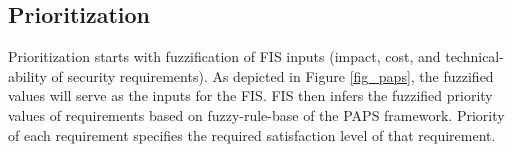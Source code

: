 \subsection{Prioritization}
\label{pas_prior}

Prioritization starts with fuzzification of FIS inputs (impact, cost, and technical-ability of security requirements). As depicted in Figure \ref{fig_paps}, the fuzzified values will serve as the inputs for the FIS. FIS then infers the fuzziﬁed priority values of requirements based on fuzzy-rule-base of the PAPS framework. Priority of each requirement specifies the required satisfaction level of that requirement. 


%	
